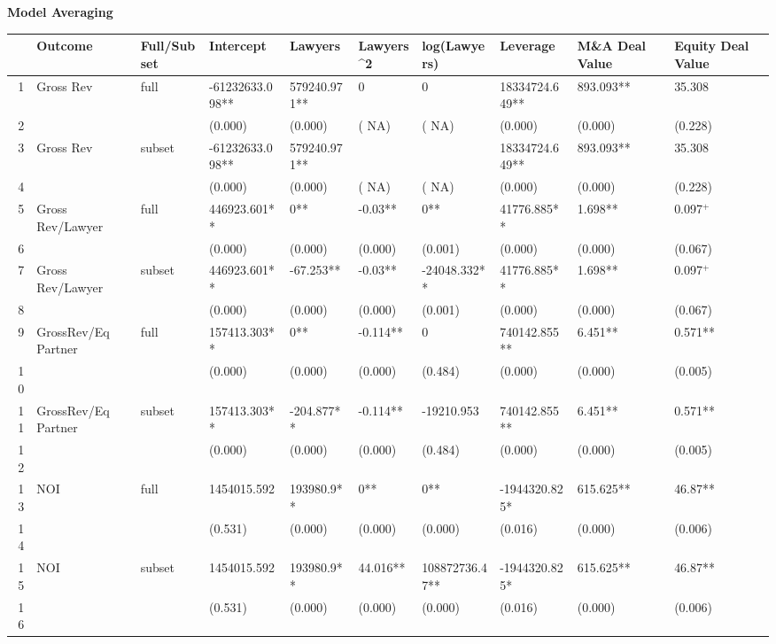 \documentclass{article}
\begin{document}
\newpage
{\large \textbf{Model Averaging} }%
\begin{table}[H]
\centering
\begin{tabular}{rlllllllll}
  \hline
 & Outcome & Full/Subset & Intercept & Lawyers & Lawyers^2 & log(Lawyers) & Leverage & M\&A Deal Value & Equity Deal Value \\ 
  \hline
1 & Gross Rev & full & -61232633.098** & 579240.971** & 0 & 0 & 18334724.649** & 893.093** & 35.308 \\ 
  2 &  &  & (0.000) & (0.000) & (   NA) & (   NA) & (0.000) & (0.000) & (0.228) \\ 
  3 & Gross Rev & subset & -61232633.098** & 579240.971** &  &  & 18334724.649** & 893.093** & 35.308 \\ 
  4 &  &  & (0.000) & (0.000) & (   NA) & (   NA) & (0.000) & (0.000) & (0.228) \\ 
  5 & Gross Rev/Lawyer & full & 446923.601** & 0** & -0.03** & 0** & 41776.885** & 1.698** & 0.097$^{+}$ \\ 
  6 &  &  & (0.000) & (0.000) & (0.000) & (0.001) & (0.000) & (0.000) & (0.067) \\ 
  7 & Gross Rev/Lawyer & subset & 446923.601** & -67.253** & -0.03** & -24048.332** & 41776.885** & 1.698** & 0.097$^{+}$ \\ 
  8 &  &  & (0.000) & (0.000) & (0.000) & (0.001) & (0.000) & (0.000) & (0.067) \\ 
  9 & GrossRev/Eq Partner & full & 157413.303** & 0** & -0.114** & 0 & 740142.855** & 6.451** & 0.571** \\ 
  10 &  &  & (0.000) & (0.000) & (0.000) & (0.484) & (0.000) & (0.000) & (0.005) \\ 
  11 & GrossRev/Eq Partner & subset & 157413.303** & -204.877** & -0.114** & -19210.953 & 740142.855** & 6.451** & 0.571** \\ 
  12 &  &  & (0.000) & (0.000) & (0.000) & (0.484) & (0.000) & (0.000) & (0.005) \\ 
  13 & NOI & full & 1454015.592 & 193980.9** & 0** & 0** & -1944320.825* & 615.625** & 46.87** \\ 
  14 &  &  & (0.531) & (0.000) & (0.000) & (0.000) & (0.016) & (0.000) & (0.006) \\ 
  15 & NOI & subset & 1454015.592 & 193980.9** & 44.016** & 108872736.47** & -1944320.825* & 615.625** & 46.87** \\ 
  16 &  &  & (0.531) & (0.000) & (0.000) & (0.000) & (0.016) & (0.000) & (0.006) \\ 

\end{tabular}
\end{table}
\end{document}
